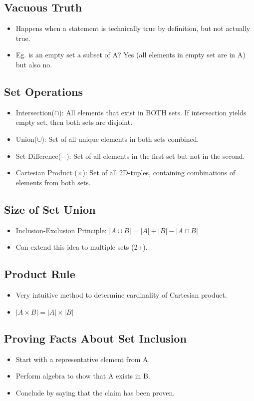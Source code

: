 \subsection{Vacuous Truth}
\begin{itemize}
    \item Happens when a statement is technically true by definition, but not actually true.
    \item Eg. is an empty set a subset of A? Yes (all elements in empty set are in A) but also no.
\end{itemize}

\subsection{Set Operations}
\begin{itemize}
    \item Intersection($\cap$): All elements that exist in BOTH sets. If intersection yields empty set, then both sets are disjoint.
    \item Union($\cup$): Set of all unique elements in both sets combined.
    \item Set Difference($-$): Set of all elements in the first set but not in the second.
    \item Cartesian Product ($\times$): Set of all 2D-tuples, containing combinations of elements from both sets.
\end{itemize}


\subsection{Size of Set Union}
\begin{itemize}
    \item Inclusion-Exclusion Principle: $|A \cup B| = |A| + |B| - |A \cap B|$
    \item Can extend this idea to multiple sets (2+).
\end{itemize}

\subsection{Product Rule}
\begin{itemize}
    \item Very intuitive method to determine cardinality of Cartesian product.
    \item $|A \times B| = |A| \times |B|$
\end{itemize}


\subsection{Proving Facts About Set Inclusion}
\begin{itemize}
    \item Start with a representative element from A.
    \item Perform algebra to show that A exists in B.
    \item Conclude by saying that the claim has been proven.
\end{itemize}